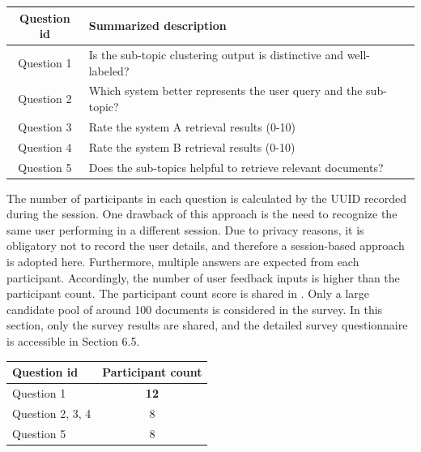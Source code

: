 \begin{center}
	\label{tab:question_summarization}
	\begin{tabularx}{.9\textwidth}{|c|Y|}
		\hline
		Question id  & Summarized description \\
		\hline
		Question 1 & Is the sub-topic clustering output is distinctive and well-labeled?  \\
		\hline
		Question 2 & Which system better represents the user query and the sub-topic? \\
		\hline
		Question 3 & Rate the system A retrieval results (0-10) \\
		\hline
		Question 4 & Rate the system B retrieval results (0-10) \\
		\hline
		Question 5 &  Does the sub-topics helpful to retrieve relevant documents?\\
		\hline
	\end{tabularx}
\end{center}

The number of participants in each question is calculated by the \ac{UUID} recorded during the session. One drawback of this approach is the need to recognize the same user performing in a different session. Due to privacy reasons, it is obligatory not to record the user details, and therefore a session-based approach is adopted here. Furthermore, multiple answers are expected from each participant. Accordingly, the number of user feedback inputs is higher than the participant count. The participant count score is shared in . Only a large candidate pool of around 100 documents is considered in the survey. In this section, only the survey results are shared, and the detailed survey questionnaire is accessible in Section 6.5.

\begin{center}
	\label{tab:participant_cnts}
	\begin{tabularx}{.6\textwidth}{|Y|c|}
		\hline
		Question id & Participant count \\
		\hline
		Question 1 & \textbf{12} \\
		\hline
		Question 2, 3, 4 & 8 \\
		\hline
		Question 5 & 8 \\
		\hline
	\end{tabularx}
\end{center}

